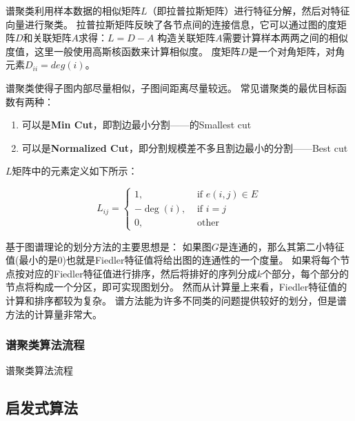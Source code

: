 谱聚类利用样本数据的相似矩阵$L$（即拉普拉斯矩阵）进行特征分解，然后对特征向量进行聚类。
拉普拉斯矩阵反映了各节点间的连接信息，它可以通过图的度矩阵$D$和关联矩阵$A$求得：$L=D-A$
构造关联矩阵$A$需要计算样本两两之间的相似度值，这里一般使用高斯核函数来计算相似度。
度矩阵$D$是一个对角矩阵，对角元素$D_{ii}=deg⁡(i)$。

谱聚类使得子图内部尽量相似，子图间距离尽量较远。
常见谱聚类的最优目标函数有两种：

\begin{enumerate}
    \item 可以是\textbf{Min Cut}，即割边最小分割——的Smallest cut
    \item 可以是\textbf{Normalized Cut}，即分割规模差不多且割边最小的分割——Best cut
\end{enumerate}

$L$矩阵中的元素定义如下所示：

\begin{equation}
    L_{i j}=\left\{\begin{array}{cc}{1,} & {\text { if } e(i, j) \in E} \\ {-\operatorname{deg}(i),} & {\text { if } i=j} \\ {0,} & {\text { other }}\end{array}\right.
\end{equation}

基于图谱理论的划分方法的主要思想是：
如果图$G$是连通的，那么其第二小特征值(最小的是$0$)也就是Fiedler特征值将给出图的连通性的一个度量。
如果将每个节点按对应的Fiedler特征值进行排序，然后将排好的序列分成$k$个部分，每个部分的节点将构成一个分区，即可实现图划分。
然而从计算量上来看，Fiedler特征值的计算和排序都较为复杂。
谱方法能为许多不同类的问题提供较好的划分，但是谱方法的计算量非常大。

\subsubsection{谱聚类算法流程}

\begin{algorithm}[htbp]
\caption{谱聚类算法流程}
\SetAlgoLined
{}

\end{algorithm}

\subsection{启发式算法}

